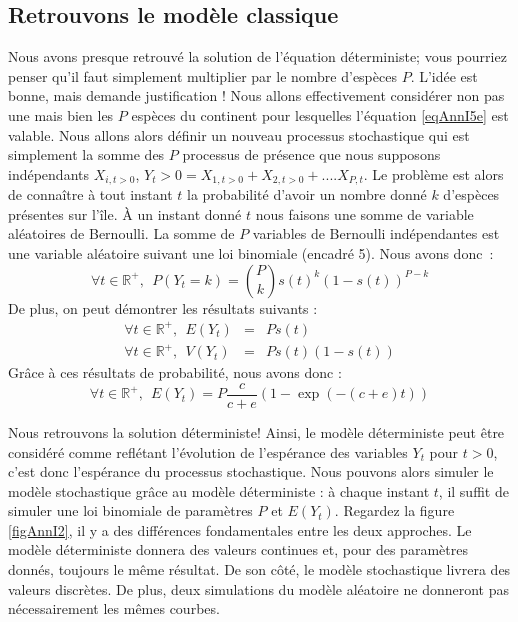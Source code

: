 \subsection{Retrouvons le modèle classique}
Nous avons presque retrouvé la solution de l'équation déterministe; vous pourriez penser qu'il faut simplement multiplier par le nombre d'espèces $P$. L'idée est bonne, mais demande justification ! Nous allons effectivement considérer non pas une mais bien les $P$ espèces du continent pour lesquelles l'équation \eqref{eqAnnI5e} est valable. Nous allons alors définir un nouveau processus stochastique qui est simplement la somme des $P$ processus de présence que nous supposons indépendants $X_{i,t>0}$, $Y_t>0=X_{1,t>0}+X_{2,t>0}+....X_{P,t}$. Le problème est alors de connaître à tout instant $t$ la probabilité d'avoir un nombre donné $k$ d'espèces présentes sur l'île. À un instant donné $t$ nous faisons une somme de variable aléatoires de Bernoulli. La somme de $P$ variables de Bernoulli indépendantes est une variable aléatoire suivant une loi binomiale (encadré 5). Nous avons donc~:
\begin{equation}
 \forall t \in \mathbb{R}^+, ~~\label{eqAnnI6a} P(Y_t=k)=\binom{P}{k}s(t)^k(1-s(t))^{P-k}
\end{equation}
De plus, on peut démontrer les résultats suivants :
\begin{eqnarray}
 \forall t \in \mathbb{R}^+, ~~\label{eqAnnI6b} E(Y_t)&=&Ps(t) \\
 \forall t \in \mathbb{R}^+, ~~\label{eqAnnI6c} V(Y_t)&=&Ps(t)(1-s(t))
\end{eqnarray}
Grâce à ces résultats de probabilité, nous avons donc :
\begin{equation}
 \forall t \in \mathbb{R}^+, ~~\label{eqAnnI6d} E(Y_t)=P\frac{c}{c+e}(1-\exp(-(c+e)t))
\end{equation}

Nous retrouvons la solution déterministe! Ainsi, le modèle déterministe peut être considéré comme reflétant l'évolution de l'espérance des variables $Y_t$ pour $t>0$, c'est donc l'espérance du processus stochastique. Nous pouvons alors simuler le modèle stochastique grâce au modèle déterministe : à chaque instant $t$, il suffit de simuler une loi binomiale de paramètres $P$ et $E(Y_t)$. Regardez la figure \ref{figAnnI2}, il y a des différences fondamentales entre les deux approches. Le modèle déterministe donnera des valeurs continues et, pour des paramètres donnés, toujours le même résultat. De son côté, le modèle stochastique livrera des valeurs discrètes. De plus, deux simulations du modèle aléatoire ne donneront pas nécessairement les mêmes courbes.

